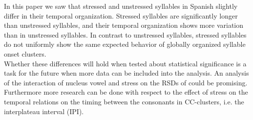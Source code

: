 \documentclass[../Proposal.tex]{subfiles}
\begin{document}

In this paper we saw that stressed and unstressed syllables in Spanish slightly differ in their temporal organization. Stressed syllables are significantly longer than unstressed syllables, and their temporal organization shows more variation than in unstressed syllables. In contrast to unstressed syllables, stressed syllables do not uniformly show the same expected behavior of globally organized syllable onset clusters.\\
Whether these differences will hold when tested about statistical significance is a task for the future when more data can be included into the analysis. An analysis of the interaction of nucleus vowel and stress on the RSDs of could be promising. Furthermore more research can be done with respect to the effect of stress on the temporal relations on the timing between the consonants in CC-clusters, i.e. the interplateau interval (IPI).
\end{document}
